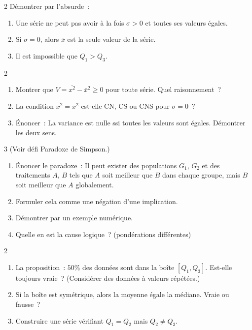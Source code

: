 \begin{bilan}
\begin{exo}{2}
D\'emontrer par l'absurde~:
\begin{enumerate}
  \item Une s\'erie ne peut pas avoir \`a la fois $\sigma>0$ et toutes ses valeurs \'egales.
  \item Si $\sigma=0$, alors $\bar{x}$ est la seule valeur de la s\'erie.
  \item Il est impossible que $Q_1>Q_3$.
\end{enumerate}
\end{exo}

\begin{exo}{2}
\begin{enumerate}
  \item Montrer que $V=\overline{x^2}-\bar{x}^2\geq0$ pour toute s\'erie.
        Quel raisonnement~?
  \item La condition $\overline{x^2}=\bar{x}^2$ est-elle CN, CS ou CNS
        pour $\sigma=0$~?
  \item \'Enoncer~: \og La variance est nulle ssi toutes les valeurs sont \'egales.\fg
        D\'emontrer les deux sens.
\end{enumerate}
\end{exo}

\begin{exo}{3}
(Voir d\'efi Paradoxe de Simpson.)
\begin{enumerate}
  \item \'Enoncer le paradoxe~: \og Il peut exister des populations $G_1$, $G_2$
        et des traitements $A$, $B$ tels que $A$ soit meilleur que $B$ dans
        chaque groupe, mais $B$ soit meilleur que $A$ globalement.\fg
  \item Formuler cela comme une n\'egation d'une implication.
  \item D\'emontrer par un exemple num\'erique.
  \item Quelle en est la cause logique~? (pond\'erations diff\'erentes)
\end{enumerate}
\end{exo}

\begin{exo}{2}
\begin{enumerate}
  \item La proposition~: \og $50\%$ des donn\'ees sont dans la bo\^ite $[Q_1,Q_3]$\fg.
        Est-elle toujours vraie~? (Consid\'erer des donn\'ees \`a valeurs r\'ep\'et\'ees.)
  \item \og Si la bo\^ite est sym\'etrique, alors la moyenne \'egale la m\'ediane.\fg
        Vraie ou fausse~?
  \item Construire une s\'erie v\'erifiant $Q_1=Q_2$ mais $Q_2\ne Q_3$.
\end{enumerate}
\end{exo}


\end{bilan}
